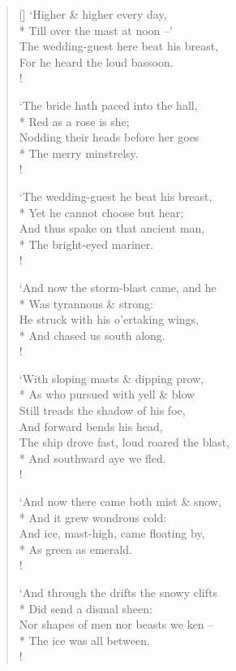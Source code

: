 \documentclass[MAIN]{subfiles}
\begin{document}
\begin{verse}[\versewidth]
`Higher \& higher every day,\\*
\vin Till over the mast at noon --'\\
The wedding-guest here beat his breast,\\
\vin For he heard the loud bassoon.\\!

`The bride hath paced into the hall,\\*
\vin Red as a rose is she;\\
Nodding their heads before her goes\\*
\vin The merry minstrelsy.\\!

`The wedding-guest he beat his breast,\\*
\vin Yet he cannot choose but hear;\\
And thus spake on that ancient man,\\*
\vin The bright-eyed mariner.\\!

`And now the storm-blast came, and he\\*
\vin Was tyrannous \& strong:\\
He struck with his o'ertaking wings,\\*
\vin And chased us south along.\\!

`With sloping masts \& dipping prow,\\*
As who pursued with yell \& blow\\
Still treads the shadow of his foe,\\
\vin And forward bends his head,\\
The ship drove fast, loud roared the blast,\\*
\vin And southward aye we fled.\\!

`And now there came both mist \& snow,\\*
\vin And it grew wondrous cold:\\
And ice, mast-high, came floating by,\\*
\vin As green as emerald.\\!

`And through the drifts the snowy clifts\\*
\vin Did send a dismal sheen:\\
Nor shapes of men nor beasts we ken --\\*
\vin The ice was all between.\\!


\end{verse}
\end{document}
